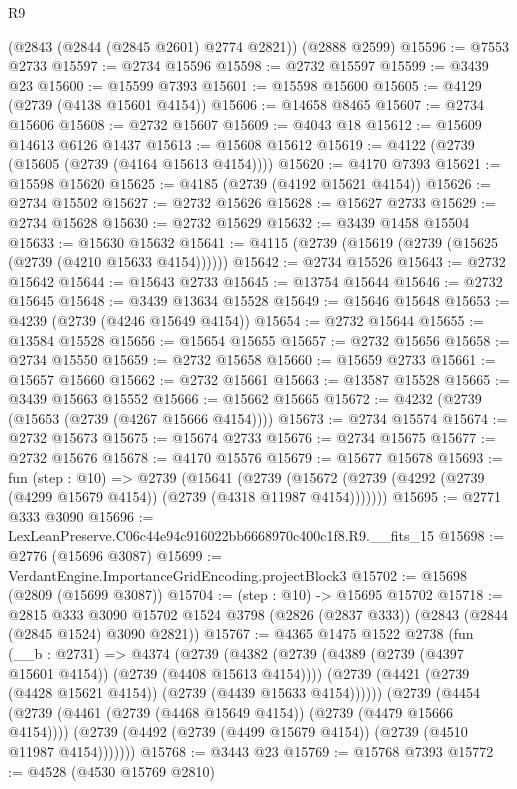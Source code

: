 \begin{lexlean}{R9}
\begin{coremodule}
    (@2843 (@2844 (@2845 @2601) @2774 @2821))
    (@2888 @2599)
@15596 := @7553 @2733
@15597 := @2734 @15596
@15598 := @2732 @15597
@15599 := @3439 @23
@15600 := @15599 @7393
@15601 := @15598 @15600
@15605 := @4129 (@2739 (@4138 @15601 @4154))
@15606 := @14658 @8465
@15607 := @2734 @15606
@15608 := @2732 @15607
@15609 := @4043 @18
@15612 := @15609 @14613 @6126 @1437
@15613 := @15608 @15612
@15619 := @4122 (@2739 (@15605 (@2739 (@4164 @15613 @4154))))
@15620 := @4170 @7393
@15621 := @15598 @15620
@15625 := @4185 (@2739 (@4192 @15621 @4154))
@15626 := @2734 @15502
@15627 := @2732 @15626
@15628 := @15627 @2733
@15629 := @2734 @15628
@15630 := @2732 @15629
@15632 := @3439 @1458 @15504
@15633 := @15630 @15632
@15641 := @4115 (@2739 (@15619 (@2739 (@15625 (@2739 (@4210 @15633 @4154))))))
@15642 := @2734 @15526
@15643 := @2732 @15642
@15644 := @15643 @2733
@15645 := @13754 @15644
@15646 := @2732 @15645
@15648 := @3439 @13634 @15528
@15649 := @15646 @15648
@15653 := @4239 (@2739 (@4246 @15649 @4154))
@15654 := @2732 @15644
@15655 := @13584 @15528
@15656 := @15654 @15655
@15657 := @2732 @15656
@15658 := @2734 @15550
@15659 := @2732 @15658
@15660 := @15659 @2733
@15661 := @15657 @15660
@15662 := @2732 @15661
@15663 := @13587 @15528
@15665 := @3439 @15663 @15552
@15666 := @15662 @15665
@15672 := @4232 (@2739 (@15653 (@2739 (@4267 @15666 @4154))))
@15673 := @2734 @15574
@15674 := @2732 @15673
@15675 := @15674 @2733
@15676 := @2734 @15675
@15677 := @2732 @15676
@15678 := @4170 @15576
@15679 := @15677 @15678
@15693 := fun (step : @10) =>
  @2739
    (@15641
      (@2739 (@15672 (@2739 (@4292 (@2739 (@4299 @15679 @4154)) (@2739 (@4318 @11987 @4154)))))))
@15695 := @2771 @333 @3090
@15696 := LexLeanPreserve.C06c44e94c916022bb6668970c400c1f8.R9.__fits_15
@15698 := @2776 (@15696 @3087)
@15699 := VerdantEngine.ImportanceGridEncoding.projectBlock3
@15702 := @15698 (@2809 (@15699 @3087))
@15704 := (step : @10) -> @15695 @15702
@15718 := @2815
    @333
    @3090
    @15702
    @1524
    @3798
    (@2826 (@2837 @333))
    (@2843 (@2844 (@2845 @1524) @3090 @2821))
@15767 := @4365
    @1475
    @1522
    @2738
    (fun (__b : @2731) =>
    @4374
      (@2739
        (@4382
          (@2739 (@4389 (@2739 (@4397 @15601 @4154)) (@2739 (@4408 @15613 @4154))))
          (@2739 (@4421 (@2739 (@4428 @15621 @4154)) (@2739 (@4439 @15633 @4154))))))
      (@2739
        (@4454
          (@2739 (@4461 (@2739 (@4468 @15649 @4154)) (@2739 (@4479 @15666 @4154))))
          (@2739 (@4492 (@2739 (@4499 @15679 @4154)) (@2739 (@4510 @11987 @4154)))))))
@15768 := @3443 @23
@15769 := @15768 @7393
@15772 := @4528 (@4530 @15769 @2810)

\end{coremodule}
\end{lexlean}
